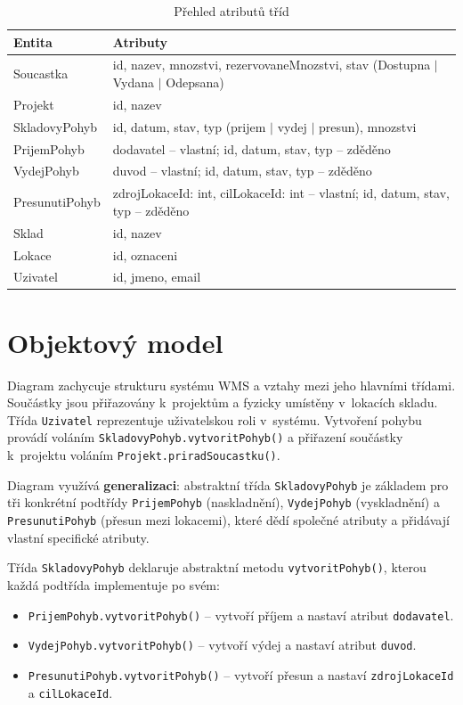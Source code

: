 \begin{table}[H]
  \centering
  \caption{Přehled atributů tříd}
  \begin{tabularx}{\textwidth}{lX}
    \toprule
    \textbf{Entita} & \textbf{Atributy} \\
    \midrule
    Soucastka    & id, nazev, mnozstvi, rezervovaneMnozstvi, stav (Dostupna $|$ Vydana $|$ Odepsana) \\
    Projekt      & id, nazev \\
    SkladovyPohyb & id, datum, stav, typ (prijem $|$ vydej $|$ presun), mnozstvi \\
    PrijemPohyb  & dodavatel -- vlastní; id, datum, stav, typ -- zděděno \\
    VydejPohyb   & duvod -- vlastní; id, datum, stav, typ -- zděděno \\
    PresunutiPohyb & zdrojLokaceId: int, cilLokaceId: int -- vlastní; id, datum, stav, typ -- zděděno \\
    Sklad        & id, nazev \\
    Lokace       & id, oznaceni \\
    Uzivatel     & id, jmeno, email \\
    \bottomrule
  \end{tabularx}
\end{table}

\newpage
\chapter{Objektový model}

Diagram zachycuje strukturu systému WMS a vztahy mezi jeho hlavními třídami.
Součástky jsou přiřazovány k~projektům a fyzicky umístěny v~lokacích skladu.
Třída \texttt{Uzivatel} reprezentuje uživatelskou roli v~systému. Vytvoření pohybu provádí voláním \texttt{SkladovyPohyb.vytvoritPohyb()} a přiřazení součástky k~projektu voláním \texttt{Projekt.priradSoucastku()}.

Diagram využívá \textbf{generalizaci}: abstraktní třída \texttt{SkladovyPohyb} je základem pro tři konkrétní podtřídy
\texttt{PrijemPohyb} (naskladnění), \texttt{VydejPohyb} (vyskladnění) a \texttt{PresunutiPohyb} (přesun mezi lokacemi),
které dědí společné atributy a přidávají vlastní specifické atributy.

Třída \texttt{SkladovyPohyb} deklaruje abstraktní metodu \texttt{vytvoritPohyb()}, kterou každá podtřída implementuje po svém:
\begin{itemize}
  \item \texttt{PrijemPohyb.vytvoritPohyb()} -- vytvoří příjem a nastaví atribut \texttt{dodavatel}.
  \item \texttt{VydejPohyb.vytvoritPohyb()} -- vytvoří výdej a nastaví atribut \texttt{duvod}.
  \item \texttt{PresunutiPohyb.vytvoritPohyb()} -- vytvoří přesun a nastaví \texttt{zdrojLokaceId} a \texttt{cilLokaceId}.
\end{itemize}

